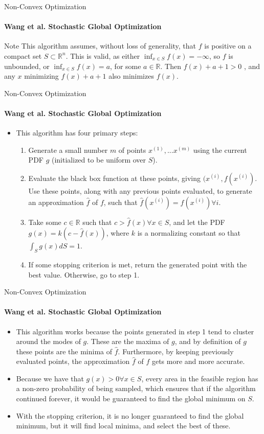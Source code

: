 \documentclass{beamer}
\begin{document}
	\begin{frame}{Non-Convex Optimization}
		\framesubtitle{Wang et al. Stochastic Global Optimization}
		\begin{block}{Note}
			This algorithm assumes, without loss of generality, that $f$ is positive on a compact set $S\subset\mathbb{R}^n$. This is valid, as either $\inf_{x\in S} {f(x)} = -\infty$, so $f$ is unbounded, or $\inf_{x\in S} {f(x)} = a$, for some $a\in\mathbb{R}$. Then $f(x) + a+1 > 0$ , and any $x$ minimizing $f(x) + a + 1$ also minimizes $f(x)$.
		\end{block}
	\end{frame}

	\begin{frame}{Non-Convex Optimization}
		\framesubtitle{Wang et al. Stochastic Global Optimization}
		\begin{itemize}
			\item This algorithm has four primary steps:
			\begin{enumerate}
				\item Generate a small number $m$ of points $x^{(1)},...x^{(m)}$ using the current PDF $g$ (initialized to be uniform over $S$).
				\item Evaluate the black box function at these points, giving $(x^{(i)},f(x^{(i)})$. Use these points, along with any previous points evaluated, to generate an approximation $\hat{f}$ of $f$, such that $\hat{f}(x^{(i)}) = f(x^{(i)}) \forall i$.
				\item Take some $c\in\mathbb{R}$ such that $c > \hat{f}(x)\forall x\in S$, and let the PDF $g(x) = k(c-\hat{f}(x))$, where $k$ is a normalizing constant so that $\int_{S}g(x)dS=1$. 
				\item If some stopping criterion is met, return the generated point with the best value. Otherwise, go to step 1.
			\end{enumerate}
		\end{itemize}
	\end{frame}

	\begin{frame}{Non-Convex Optimization}
		\framesubtitle{Wang et al. Stochastic Global Optimization}
		\begin{itemize}
			\item This algorithm works because the points generated in step 1 tend to cluster around the modes of $g$. These are the maxima of $g$, and by definition of $g$ these points are the minima of $\hat{f}$. Furthermore, by keeping previously evaluated points, the approximation $\hat{f}$ of $f$ gets more and more accurate. 
			\item Because we have that $g(x) > 0\forall x\in S$, every area in the feasible region has a non-zero probability of being sampled, which ensures that if the algorithm continued forever, it would be guaranteed to find the global minimum on $S$. 
			\item With the stopping criterion, it is no longer guaranteed to find the global minimum, but it will find local minima, and select the best of these.
		\end{itemize}
	\end{frame}
\end{document}
